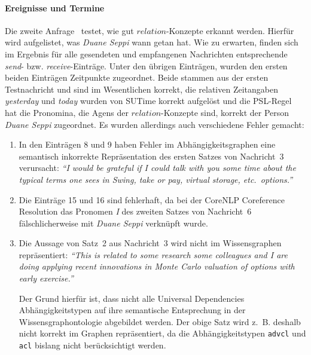 \paragraph{Ereignisse und Termine}
Die zweite Anfrage~ testet, wie gut $relation$-Konzepte erkannt werden.
Hierfür wird aufgelistet, was \textit{Duane Seppi} wann getan hat.
Wie zu erwarten, finden sich im Ergebnis für alle gesendeten und empfangenen Nachrichten entsprechende \textit{send}- bzw. \textit{receive}-Einträge.
Unter den übrigen Einträgen, wurden den ersten beiden Einträgen Zeitpunkte zugeordnet.
Beide stammen aus der ersten Testnachricht und sind im Wesentlichen korrekt, die relativen Zeitangaben \textit{yesterday} und \textit{today} wurden von SUTime korrekt aufgelöst und die PSL-Regel  hat die Pronomina, die Agens der $relation$-Konzepte sind, korrekt der Person \textit{Duane Seppi} zugeordnet.
Es wurden allerdings auch verschiedene Fehler gemacht:
\begin{enumerate}
	\item In den Einträgen 8 und 9 haben Fehler im Abhängigkeitsgraphen eine semantisch inkorrekte Repräsentation des ersten Satzes von Nachricht~3 verursacht:
	 	\textit{``I would be grateful if I could talk with you some time about the typical terms one sees in Swing, take or pay, virtual storage, etc.\ options.''} \errorA\
	\item Die Einträge 15 und 16 sind fehlerhaft, da bei der CoreNLP Coreference Resolution das Pronomen \textit{I} des zweiten Satzes von Nachricht~6 fälschlicherweise mit \textit{Duane Seppi} verknüpft wurde. \errorA\
	\item Die Aussage von Satz~2 aus Nachricht~3 wird nicht im Wissensgraphen repräsentiert:
		\textit{``This is related to some research some colleagues and I are doing applying recent innovations in Monte Carlo valuation of options with early exercise.''} \errorB\

		Der Grund hierfür ist, dass nicht alle Universal Dependencies Abhängigkeitstypen auf ihre semantische Entsprechung in der Wissensgraphontologie abgebildet werden.
		Der obige Satz wird z.~B. deshalb nicht korrekt im Graphen repräsentiert, da die Abhängigkeitstypen \texttt{advcl} und \texttt{acl} bislang nicht berücksichtigt werden.
\end{enumerate}

